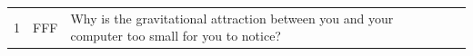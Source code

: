 \documentclass[10pt]{article}
\begin{document}
\begin{tiny}
\begin{longtable}{r p{0.3in} p{1.212in} p{3.8in}}
    1  &          FFF &                                                                                                                                                                                   Why is the gravitational attraction between you and your computer too small for you to notice? &                                                                                                                                                                                                                                                                                                                                                                                                                                                                                                                                                                                                                                                                                                                                                                                                                                                                                                                                                                                                                                                                                                                                                                                                                                                                                                                                                                                                                                                                                                                                                                                                                                                                                                                                                                                                                                                                                                                                                                                                                                                                                                                                                                                                                                                                                                                                                                                                                                                                                                                                                                                                                                                                                                                                                                                                                                                                                                                                                                                                                                                                                               
\end{longtable}
\end{tiny}
\end{document}

